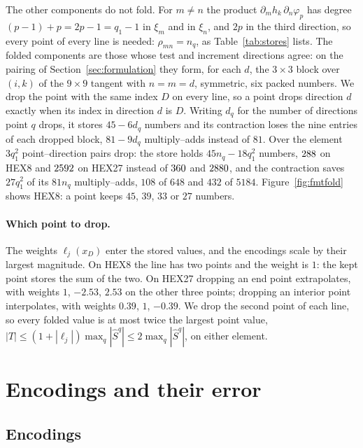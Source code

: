 \documentclass[sigconf,balance=false]{acmart}
\newcommand{\Sq}{\widehat{S}^{q}}
\begin{document}
The other components do not fold.  For $m\ne n$ the product $\partial_m h_k\,\partial_n\varphi_p$ has
degree $(p-1)+p=2p-1=q_1-1$ in $\xi_m$ and in $\xi_n$, and $2p$ in the third direction, so every
point of every line is needed: $\rho_{mn}=n_q$, as Table~\ref{tab:stores} lists.  The folded
components are those whose test and increment directions agree: on the pairing of
Section~\ref{sec:formulation} they form, for each $d$, the $3\times3$ block over $(i,k)$ of the $9\times9$
tangent with $n=m=d$, symmetric, six packed numbers.  We drop the point with the same index $D$ on
every line, so a point drops direction $d$ exactly when its index in direction $d$ is $D$.  Writing
$d_q$ for the number of directions point $q$ drops, it stores $45-6d_q$ numbers and its
contraction loses the nine entries of each dropped block, $81-9d_q$ multiply--adds instead of $81$.
Over the element $3q_1^2$ point--direction pairs drop: the store holds $45n_q-18q_1^2$ numbers,
$288$ on HEX8 and $2592$ on HEX27 instead of $360$ and
$2880$, and the contraction saves $27q_1^2$ of its $81n_q$ multiply--adds, $108$ of
$648$ and $432$ of $5184$.  Figure~\ref{fig:fmtfold} shows HEX8: a point keeps $45$, $39$, $33$ or $27$
numbers.

\paragraph{Which point to drop.}  The weights $\ell_j(x_D)$ enter the stored values, and the
encodings scale by their largest magnitude.  On HEX8 the line has two points and the weight is $1$:
the kept point stores the sum of the two.  On HEX27 dropping an end point extrapolates, with
weights $1$, $-2.53$, $2.53$ on the other three points; dropping an interior point interpolates, with
weights $0.39$, $1$, $-0.39$.  We drop the second point of each line, so every folded value is at
most twice the largest point value, $|T|\le(1+|\ell_j|)\max_q|\Sq|\le 2\max_q|\Sq|$, on either
element.

\section{Encodings and their error}
\label{sec:compression}

\subsection{Encodings}
\end{document}
